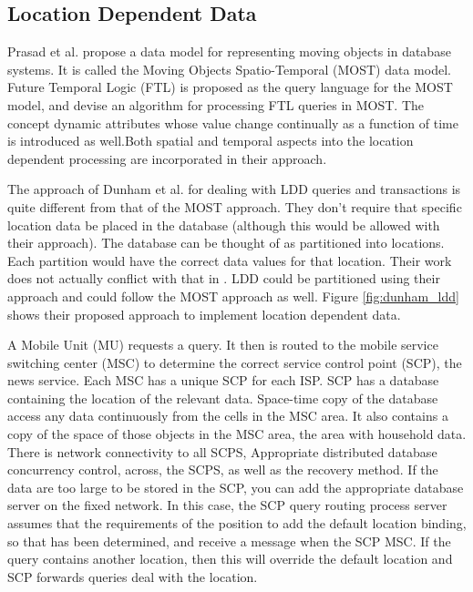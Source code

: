 \documentclass[12pt,a4paper]{article}
\begin{document}
\subsection{Location Dependent Data} %
\label{sub:location_dependent_data_c}
Prasad et al. propose a data model for representing moving objects in database systems. It is called the Moving Objects Spatio-Temporal (MOST) data model. Future Temporal Logic (FTL) is proposed as the query language for the MOST model, and devise an algorithm for processing FTL queries in MOST. \cite{prasad1997modeling} The concept dynamic attributes whose value change continually as a function of time is introduced as well.Both spatial and temporal aspects into the location dependent processing are incorporated in their approach.

The approach of Dunham et al. for dealing with LDD queries and transactions is quite different from that of the MOST approach. They don't require that specific location data be  placed in the database (although this would be allowed with their approach). The database can be thought of as partitioned into locations. Each partition would have the correct data values for that location. Their work does not actually conflict with that in \cite{prasad1997modeling}. LDD could be partitioned using their approach and could follow the MOST approach as well. \cite{Dunham:1998ci} Figure \ref{fig:dunham_ldd} shows their proposed approach to implement location dependent data. 

A Mobile Unit (MU) requests a query. It then is routed to the mobile service switching center (MSC) to determine the correct service control point (SCP), the news service. Each MSC has a unique SCP for each ISP. SCP has a database containing the location of the relevant data. Space-time copy of the database access any data continuously from the cells in the MSC area. It also contains a copy of the space of those objects in the MSC area, the area with household data. There is network connectivity to all SCPS, Appropriate distributed database concurrency control, across, the SCPS, as well as the recovery method. If the data are too large to be stored in the SCP, you can add the appropriate database server on the fixed network. In this case, the SCP query routing process server assumes that the requirements of the position to add the default location binding, so that has been determined, and receive a message when the SCP MSC. If the query contains another location, then this will override the default location and SCP forwards queries deal with the location. \cite{Dunham:1998ci}
\end{document}

